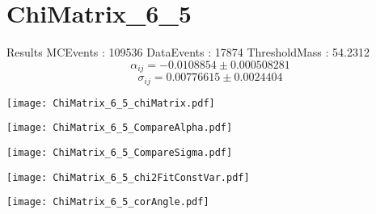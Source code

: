 \documentclass[a4paper,12pt]{article}
\begin{document}
\section{ChiMatrix\_6\_5}
\begin{minipage}{0.49\linewidth} Results \newline
MCEvents : 109536\newline
DataEvents : 17874 \newline
ThresholdMass : 54.2312\\
$$\alpha_{ij} = -0.0108854\pm 0.000508281$$
$$\sigma_{ij} = 0.00776615\pm 0.0024404$$
\end{minipage}\hfill
\begin{minipage}{0.49\linewidth} 
\texttt{[image: ChiMatrix\_6\_5\_chiMatrix.pdf]}\\
\end{minipage}
\hfill
\begin{minipage}{0.49\linewidth} 
\texttt{[image: ChiMatrix\_6\_5\_CompareAlpha.pdf]}\\
\end{minipage}
\hfill
\begin{minipage}{0.49\linewidth} 
\texttt{[image: ChiMatrix\_6\_5\_CompareSigma.pdf]}\\
\end{minipage}
\begin{minipage}{0.49\linewidth} 
\texttt{[image: ChiMatrix\_6\_5\_chi2FitConstVar.pdf]}\\
\end{minipage}
\hfill
\begin{minipage}{0.49\linewidth} 
\texttt{[image: ChiMatrix\_6\_5\_corAngle.pdf]}\\
\end{minipage}
\end{document}
